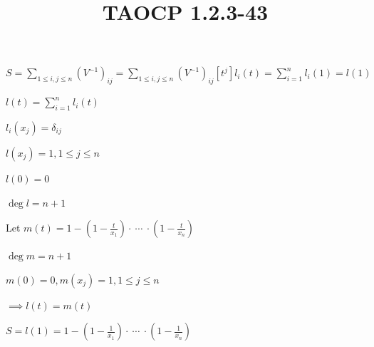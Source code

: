 \documentclass{article}
\title{TAOCP 1.2.3\mbox{-}43}
\begin{document}
\maketitle

\( S = \sum_{1 \leq i,j \leq n} {(V^{-1})}_{ij} = \sum_{1 \leq i,j \leq n} {(V^{-1})}_{ij} [t^{j}]l_{i}(t) = \sum_{i=1}^{n} l_{i}(1) = l(1) \)

\( l(t) = \sum_{i=1}^{n} l_{i}(t) \)

\( l_{i}(x_{j}) = \delta_{ij} \)

\( l(x_{j}) = 1, 1 \leq j \leq n \)

\( l(0) = 0 \)

\( \deg l = n + 1 \)

Let \( m(t) = 1 - (1-\frac{t}{x_{1}}) \cdot\ \cdots\ \cdot (1-\frac{t}{x_{n}}) \)

\( \deg m = n + 1 \)

\( m(0) = 0, m(x_{j}) = 1, 1 \leq j \leq n \)

\( \implies l(t) = m(t) \)

\( S = l(1) = 1 - (1-\frac{1}{x_{1}}) \cdot\ \cdots\ \cdot (1-\frac{1}{x_{n}}) \)
\end{document}
